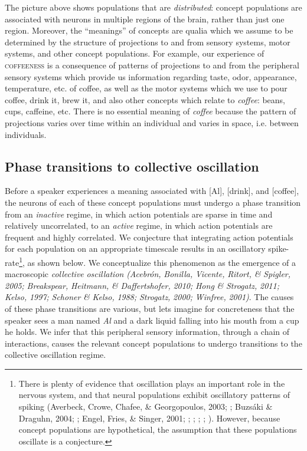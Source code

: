   The picture above shows populations that are \textit{distributed}: concept populations are associated with neurons in multiple regions of the brain, rather than just one region. Moreover, the “meanings” of concepts are qualia which we assume to be determined by the structure of projections to and from sensory systems, motor systems, and other concept populations. For example, our experience of \textsc{coffeeness} is a consequence of patterns of projections to and from the peripheral sensory systems which provide us information regarding taste, odor, appearance, temperature, etc. of coffee, as well as the motor systems which we use to pour coffee, drink it, brew it, and also other concepts which relate to \textit{coffee}: beans, cups, caffeine, etc. There is no essential meaning of \textit{coffee} because the pattern of projections varies over time within an individual and varies in space, i.e. between individuals.

\subsection{{\textbf{Phase transitions to collective oscillation}}}

Before a speaker experiences a meaning associated with [Al], [drink], and [coffee], the neurons of each of these concept populations must undergo a phase transition from an \textit{inactive} regime, in which action potentials are sparse in time and relatively uncorrelated, to an \textit{active} regime, in which action potentials are frequent and highly correlated. We conjecture that integrating action potentials for each population on an appropriate timescale results in an oscillatory spike-rate\footnote{There is plenty of evidence that oscillation plays an important role in the nervous system, and that neural populations exhibit oscillatory patterns of spiking (Averbeck, Crowe, Chafee, \& Georgopoulos, 2003; \citealt{Buzsaki2006}; Buzsáki \& Draguhn, 2004; \citealt{CanoltyKnight2010}; Engel, Fries, \& Singer, 2001; \citealt{Fuster2001}; \citealt{GerstnerKistler2002}; \citealt{Izhikevich2006,Izhikevich2007}; \citealt{IzhikevichEdelman2008}; \citealt{Klimesch1999}). However, because concept populations are hypothetical, the assumption that these populations oscillate is a conjecture.}, as shown below. We conceptualize this phenomenon as the emergence of a macroscopic \textit{collective} \textit{oscillation} \textit{(Acebrón,} \textit{Bonilla,} \textit{Vicente,} \textit{Ritort,} \textit{\&} \textit{Spigler,} \textit{2005;} \textit{Breakspear,} \textit{Heitmann,} \textit{\&} \textit{Daffertshofer,} \textit{2010;} \textit{Hong} \textit{\&} \textit{Strogatz,} \textit{2011;} \textit{Kelso,} \textit{1997;} \textit{Schoner} \textit{\&} \textit{Kelso,} \textit{1988;} \textit{Strogatz,} \textit{2000;} \textit{Winfree,} \textit{2001)}. The causes of these phase transitions are various, but lets imagine for concreteness that the speaker sees a man named \textit{Al} and a dark liquid falling into his mouth from a cup he holds. We infer that this peripheral sensory information, through a chain of interactions, causes the relevant concept populations to undergo transitions to the collective oscillation regime.

